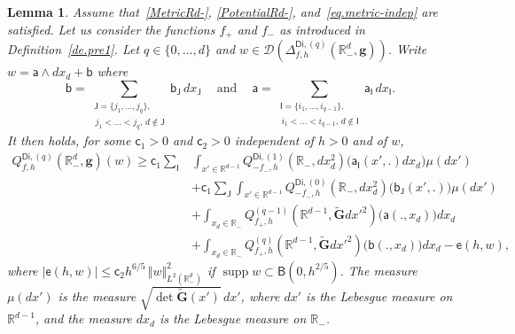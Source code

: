 \documentclass[JEP,XML,SOM,Unicode,NoEqCountersInSection,NoFloatCountersInSection,published]{cedram}
\newcommand{\quand}{\quad\text{and}\quad}
\newcommand{\mbf}[1]{\mathbf{#1}}
\DeclareMathOperator\supp{supp}
\theoremstyle{plain}
\newtheorem{lemma}[proposition]{Lemma}
\theoremstyle{definition}
\begin{document}
\begin{lemma}\label{le.splitting}
Assume that~\ref{MetricRd-}, \ref{PotentialRd-},
and~\eqref{eq.metric-indep} are satisfied. Let us consider the
functions $f_+$ and $f_-$ as introduced in Definition~\ref{de.pre1}.
Let $q\in \{0,\ldots,d\}$ and $w\in \mathcal D(\Delta^{\mathsf{Di},(q)}_{f,h}(\mathbb R_-^d, \mbf g))$.
Write $w=\mathsf a \wedge dx_d+ \mathsf b$
where
\[
\mathsf b = \sum_{\substack{\mathsf J=\{j_1,\ldots,j_q\},\\ \, j_1<\ldots<j_q, \, d\notin \mathsf J} } \mathsf b_{\mathsf J}\, dx_{\mathsf J} \ \quand \ \mathsf a =\sum_{\substack{\mathsf I =\{i_1,\ldots,i_{q-1}\},\\ \, i_1<\ldots<i_{q-1},\,d\notin \mathsf I }} \mathsf a_{\mathsf I}\, dx_{\mathsf I}.
\]
It then holds, for some $\mathsf c_1>0$ and $\mathsf c_2>0$
independent of $h>0$ and of $w$,
\begin{align*}
\nonumber
Q^{\mathsf{Di},(q)}_{f,h}(\mathbb R_-^d, \mbf g)(w) \ge \mathsf c_1 \sum_{\mathsf I }& \int_{x'\in \mathbb R^{d-1} } Q^{\mathsf{Di},(1)}_{-f_-,h}(\mathbb R_-, dx_d^2)\bigl(\mathsf a_{\mathsf I}(x',.)dx_d \bigr) \mu(dx')\\
& + \mathsf c _1\sum_{\mathsf J } \int_{x'\in \mathbb R^{d-1} } Q^{\mathsf{Di},(0)}_{-f_-,h}(\mathbb R_-, dx_d^2)\bigl(\mathsf b_{\mathsf J}(x',.) \bigr) \mu(dx')\\
& + \int_{x_d\in \mathbb R_- } Q^{(q-1)}_{f_+,h}(\mathbb R^{d-1}, \tilde {\mbf G}dx'^2)\bigl(\mathsf a(.,x_d)\bigr) dx_d \\
& + \int_{x_d\in \mathbb R_- } Q^{(q)}_{f_+,h}(\mathbb
R^{d-1}, \tilde {\mbf G}dx'^2)\bigl(\mathsf b(.,x_d) \big) dx_d - \mathsf e(h,w),
\end{align*}
where $\vert \mathsf e(h,w)\vert \le \mathsf c_2h^{6/5}\, \Vert w
\Vert_{L^2(\mathbb R^d_-)}^2$ if $\supp w\subset \mathsf B(0,h^{2/5})$.
The measure $\mu(dx')$ is the measure $\sqrt{\det \tilde {\mbf G}(x')} \, dx'$, where $dx'$ is the Lebesgue measure on $\mathbb R^{d-1}$, and the measure $dx_d$ is the Lebesgue measure on $\mathbb R_-$.
\end{lemma}
\end{document}

